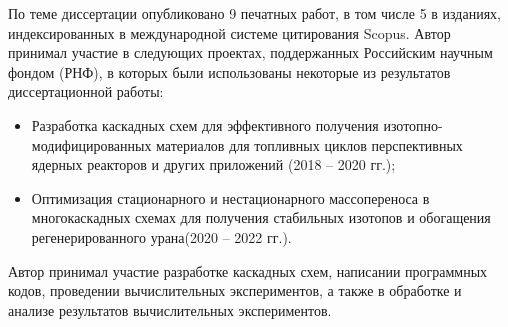 По теме диссертации опубликовано 9 печатных работ, в том числе 5 в изданиях, индексированных в международной системе цитирования Scopus. Автор принимал участие в следующих проектах, поддержанных Российским научным фондом (РНФ), в которых были использованы некоторые из результатов диссертационной работы: 
\begin{itemize}
  \item Разработка каскадных схем для эффективного получения изотопно-модифицированных материалов для топливных циклов перспективных ядерных реакторов и других приложений (2018 -- 2020 гг.);
  \item Оптимизация стационарного и нестационарного массопереноса в многокаскадных схемах для получения стабильных изотопов и обогащения регенерированного урана(2020 -- 2022 гг.).
\end{itemize}


{\contribution} Автор принимал участие разработке каскадных схем, написании программных кодов, проведении вычислительных экспериментов, а также в обработке и анализе результатов вычислительных экспериментов.


